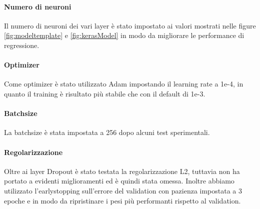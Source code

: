 \paragraph{Numero di neuroni} Il numero di neuroni dei vari layer è stato
impostato ai valori mostrati nelle figure \ref{fig:modeltemplate} e
\ref{fig:kerasModel} in modo da migliorare le performance di regressione.

\paragraph{Optimizer} Come optimizer è stato utilizzato Adam impostando il learning rate a 1e-4, in quanto il training è
risultato più stabile che con il default di 1e-3.

\paragraph{Batchsize} La batchsize è stata impostata a 256 dopo alcuni test
sperimentali.

\paragraph{Regolarizzazione} Oltre ai layer Dropout è stato testata la
regolarizzazione L2, tuttavia non ha portato a evidenti miglioramenti ed è
quindi stata omessa. Inoltre abbiamo utilizzato l'earlystopping sull'errore del
validation con pazienza impostata a 3 epoche e in modo da ripristinare i pesi
più performanti rispetto al validation.
